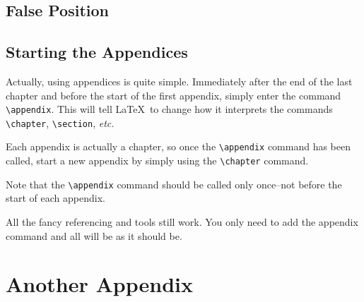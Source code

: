 \documentclass[12pt]{report}
\begin{document}


\section{False Position}



\section{Starting the Appendices}
Actually, using appendices is quite simple.  Immediately after the end
of the last chapter and before the start of the first appendix, simply
enter the command \verb|\appendix|.  This will tell \LaTeX~to change
how it interprets the commands \verb|\chapter|, \verb|\section|,
\textit{etc.}

Each appendix is actually a chapter, so once the \verb|\appendix|
command has been called, start a new appendix by simply using the
\verb|\chapter| command.

Note that the \verb|\appendix| command should be called only
once--not before the start of each appendix.

All the fancy referencing and tools still work.
You only need to add the appendix command and all will be as it should be.

\chapter{Another Appendix}
\end{document}
